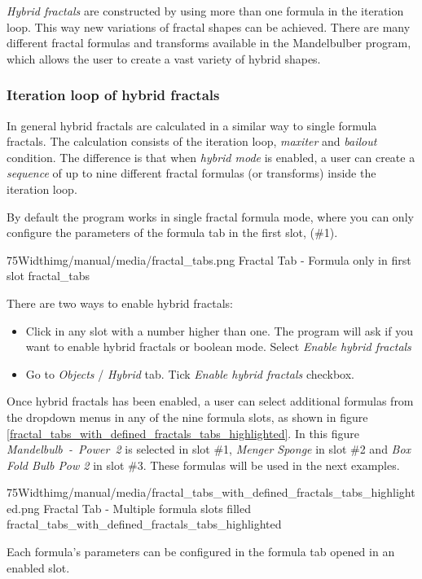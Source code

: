 \emph{Hybrid fractals} are constructed by using more than one formula in the iteration loop.
This way new variations of fractal shapes can be achieved. There are many different fractal formulas and transforms available in the Mandelbulber program, which allows the user to create a vast variety of hybrid shapes.

\subsubsection{Iteration loop of hybrid fractals}

In general hybrid fractals are calculated in a similar way to single formula fractals.
The calculation consists of the iteration loop, \emph{maxiter} and \emph{bailout} condition. The
difference is that when \emph{hybrid mode} is enabled, a user can create a \emph{sequence} of up to nine different fractal formulas (or transforms) inside the iteration loop. 

By default the program works in single fractal formula mode, where you can only configure the parameters of the formula tab in the first slot,
(\#1). 

\simpleImageWithCaption75Width{img/manual/media/fractal_tabs.png}
{Fractal Tab - Formula only in first slot}
{fractal_tabs}

There are two ways to enable hybrid fractals:
\begin{itemize}
	\item Click in any slot with a number higher than one. The program will ask if you want to
	enable hybrid fractals or boolean mode. Select \emph{Enable hybrid fractals}
	\item Go to \emph{Objects} / \emph{Hybrid} tab. Tick \emph{Enable hybrid fractals} checkbox.
\end{itemize}

Once hybrid fractals has been enabled, a user can select additional formulas from the dropdown menus in any of the nine formula slots,
as shown in figure \ref{fractal_tabs_with_defined_fractals_tabs_highlighted}.
In this figure \emph{Mandelbulb~-~Power~2} is selected in slot \#1, \emph{Menger Sponge}
in slot \#2 and \emph{Box Fold Bulb Pow 2} in slot \#3. These formulas will be
used in the next examples.

\simpleImageWithCaption75Width{img/manual/media/fractal_tabs_with_defined_fractals_tabs_highlighted.png}
{Fractal Tab - Multiple formula slots filled}
{fractal_tabs_with_defined_fractals_tabs_highlighted}

Each formula's parameters can be configured in the formula tab opened in an enabled slot.


